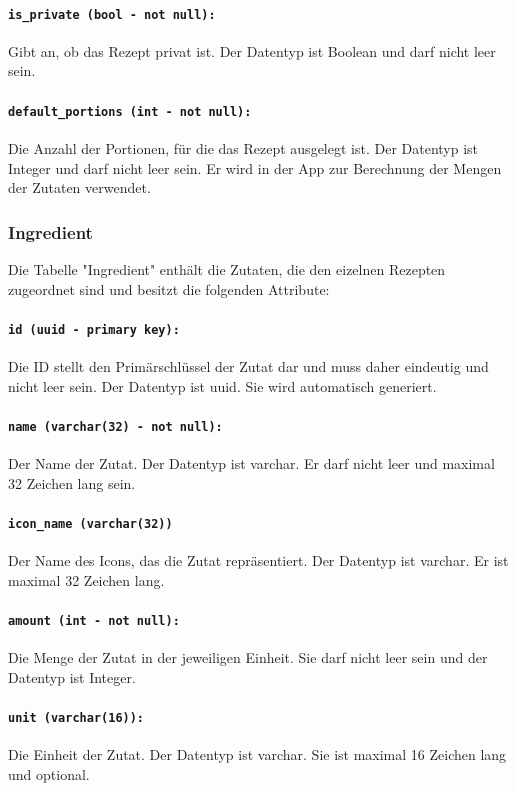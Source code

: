 \documentclass{entwurfsheft}
\begin{document}
\begin{sloppypar}
\paragraph{\texttt{is\_private (bool - not null):}} Gibt an, ob das Rezept privat ist. Der Datentyp ist Boolean und darf nicht leer sein.
\paragraph{\texttt{default\_portions (int - not null):}} Die Anzahl der Portionen, für die das Rezept ausgelegt ist. Der Datentyp ist Integer und darf nicht leer sein. Er wird in der App zur Berechnung der Mengen der Zutaten verwendet.
\newpage
\subsubsection{Ingredient}
Die Tabelle "Ingredient" enthält die Zutaten, die den eizelnen Rezepten zugeordnet sind und besitzt die folgenden Attribute:
\paragraph{\texttt{id (uuid - primary key):}} Die ID stellt den Primärschlüssel der Zutat dar und muss daher eindeutig und nicht leer sein. Der Datentyp ist \Gls{uuid}. Sie wird automatisch generiert.
\paragraph{\texttt{name (varchar(32) - not null):}} Der Name der Zutat. Der Datentyp ist \Gls{varchar}. Er darf nicht leer und maximal 32 Zeichen lang sein.
\paragraph{\texttt{icon\_name (varchar(32))}} Der Name des Icons, das die Zutat repräsentiert. Der Datentyp ist \Gls{varchar}. Er ist maximal 32 Zeichen lang.
\paragraph{\texttt{amount (int - not null):}} Die Menge der Zutat in der jeweiligen Einheit. Sie darf nicht leer sein und der Datentyp ist Integer.
\paragraph{\texttt{unit (varchar(16)):}} Die Einheit der Zutat. Der Datentyp ist \Gls{varchar}. Sie ist maximal 16 Zeichen lang und optional.

\end{sloppypar}
\end{document}

